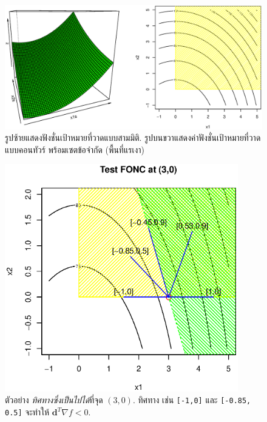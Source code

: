 %
\begin{figure}
\begin{center}
\includegraphics[width=6.0in]
{02Background/FONCexample.eps}
\end{center}
\caption{รูปซ้ายแสดงฟังชั่นเป้าหมายที่วาดแบบสามมิติ.
รูปบนขวาแสดงค่าฟังชั่นเป้าหมายที่วาดแบบคอนทัวร์ พร้อมเซตข้อจำกัด (พื้นที่แรเงา)}
\label{fig: FONC example}
\end{figure}
%


%
\begin{figure}
\begin{center}
\includegraphics[width=4.0in]
{02Background/FONCExampleP30.eps}
\end{center}
\caption{ตัวอย่าง \textit{ทิศทางซึ่งเป็นไปได้}ที่จุด $(3,0)$.
ทิศทาง เช่น \texttt{[-1,0]} และ \texttt{[-0.85, 0.5]} 
จะทำให้ $\mathbf{d}^T \nabla f < 0$.}
\label{fig: FONC example P(3,0)}
\end{figure}
%

